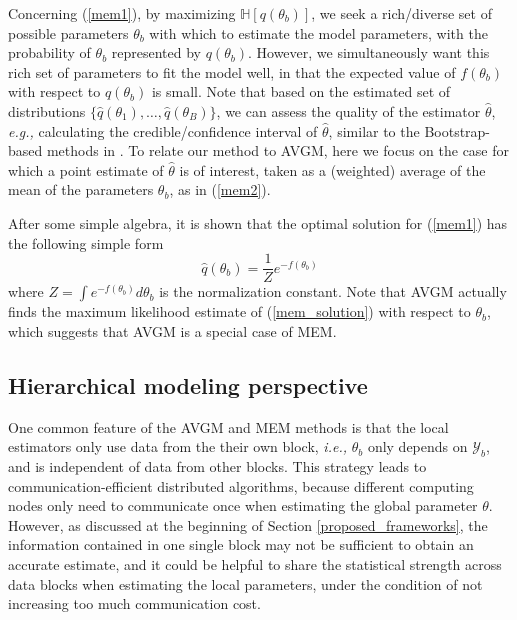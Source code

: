 \documentclass{article}
\newcommand{\ie}[0]{\emph{i.e., }}
\newcommand{\eg}[0]{\emph{e.g., }}
\newcommand{\1}[0]{\ensuremath{\boldsymbol{1}}\xspace}
\begin{document}
Concerning (\ref{mem1}), by maximizing $\mathbb{H}[q(\theta_b)]$, we seek a rich/diverse set of possible parameters $\theta_b$ with which to estimate the model parameters, with the probability of $\theta_b$ represented by $q(\theta_b)$. However, we simultaneously want this rich set of parameters to fit the model well, in that the expected value of $f(\theta_b)$ with respect to $q(\theta_b)$ is small. Note that based on the estimated set of distributions $\{\hat q(\theta_1), \ldots, \hat q(\theta_B)\}$, we can assess the quality of the estimator $\hat\theta$, \eg calculating the credible/confidence interval of $\hat\theta$, similar to the Bootstrap-based methods in \cite{Kleiner2012}. To relate our method to AVGM, here we focus on the case for which a point estimate of $\hat\theta$ is of interest, taken as a (weighted) average of the mean of the parameters $\theta_b$, as in (\ref{mem2}).

After some simple algebra, it is shown that the optimal solution for (\ref{mem1}) has the following simple form
\begin{equation}\label{mem_solution}
\textstyle \hat q(\theta_b) = \frac{1}{Z}e^{-f(\theta_b)}
\end{equation}
where $Z = \int e^{-f(\theta_b)} d\theta_b$ is the normalization constant. Note that AVGM actually finds the maximum likelihood estimate of (\ref{mem_solution}) with respect to $\theta_b$, which suggests that AVGM is a special case of MEM.


\subsection{Hierarchical modeling perspective}\label{HM}

One common feature of the AVGM and MEM methods is that the local estimators only use data from the their own block, \ie $\theta_b$ only depends on $\mathcal{Y}_b$, and is independent of data from other blocks. This strategy leads to communication-efficient distributed algorithms, because different computing nodes only need to communicate once when estimating the global parameter $\theta$. However, as discussed at the beginning of Section \ref{proposed_frameworks}, the information contained in one single block may not be sufficient to obtain an accurate estimate, and it could be helpful to share the statistical strength across data blocks when estimating the local parameters, under the condition of not increasing too much communication cost.
\end{document}
